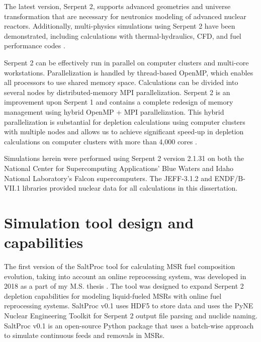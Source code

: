 The latest version, Serpent 2, supports advanced geometries and universe 
transformation that are necessary for neutronics modeling of advanced nuclear 
reactors. Additionally, multi-physics simulations using Serpent 2 have been 
demonstrated, including  calculations with thermal-hydraulics, \gls{CFD}, and 
fuel performance codes \cite{leppanen_numerical_2015}. 

Serpent 2 can be effectively run in parallel on computer clusters and 
multi-core workstations. Parallelization is handled by thread-based OpenMP, 
which enables all processors to use shared memory space. Calculations can be 
divided into several nodes by distributed-memory \gls{MPI} parallelization. 
Serpent 2  is an improvement upon Serpent 1 and contains a complete redesign 
of memory management using hybrid OpenMP \cite{dagum_openmp_1998} + \gls{MPI} 
parallelization.  This hybrid parallelization is substantial for depletion 
calculations using computer clusters with multiple nodes and allows us to 
achieve significant speed-up in depletion calculations on computer clusters 
with more than 4,000 cores \cite{leppanen_serpent_2014}. 

Simulations herein were performed using Serpent 2 version 2.1.31 on both the 
National Center for Supercomputing Applications' Blue Waters and Idaho 
National Laboratory's Falcon supercomputers. The JEFF-3.1.2 
\cite{oecd/nea_jeff-3.1.2_2014} and ENDF/B-VII.1 
\cite{chadwick_endf/b-vii.1_2011} libraries provided nuclear data 
for all calculations in this dissertation. 

\section{Simulation tool design and capabilities}\label{sec:tool_design}
The first version of the SaltProc tool for calculating \gls{MSR} fuel 
composition evolution, taking into account an online reprocessing system,  
was developed in 2018 as a part of my M.S. thesis  
\cite{rykhlevskii_arfc/saltproc_2018, rykhlevskii_advanced_2018}. The tool was 
designed to expand Serpent 2 depletion capabilities for modeling liquid-fueled 
\glspl{MSR} with online fuel reprocessing systems. SaltProc v0.1 uses HDF5 
\cite{the_hdf_group_hierarchical_1997} to store data and uses the PyNE Nuclear 
Engineering Toolkit \cite{scopatz_pyne_2012} for Serpent 2 output file parsing 
and nuclide naming. SaltProc v0.1 is an open-source Python package that uses a 
batch-wise approach to simulate continuous feeds and removals in \glspl{MSR}. 

